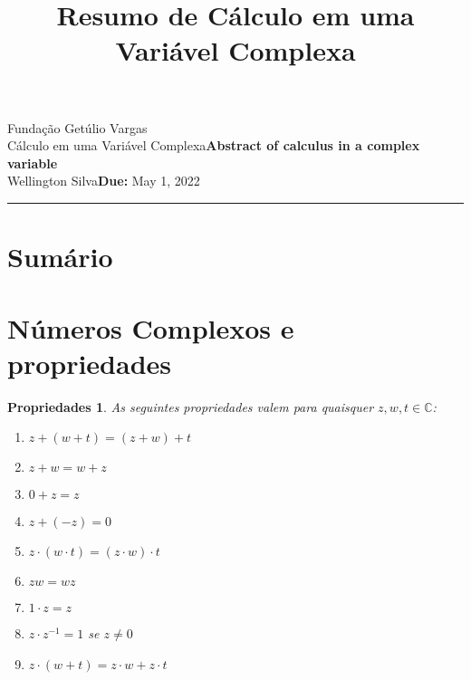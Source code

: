\documentclass{article}
\title{Resumo de Cálculo em uma Variável Complexa}
\author{}
\date{}
\newtheorem{prop}{Propriedades}
\newcommand{\assignment}{Abstract of calculus in a complex variable}
\newcommand{\duedate}{May 1, 2022}
\begin{document}
Fundação Getúlio Vargas\hfill\\
Cálculo em uma Variável Complexa\hfill\textbf{\assignment}\\
Wellington Silva\hfill\textbf{Due:} \duedate\\
\smallskip\hrule\bigskip

{\let\newpage\relax\maketitle}
\maketitle

\section*{Sumário}

\textbf{}
\vspace{4.0mm}

\textbf{}
\vspace{4.0mm}

\textbf{}
\vspace{4.0mm}

\textbf{}
\vspace{4.0mm}

\textbf{}
\vspace{4.0mm}

\textbf{}
\vspace{4.0mm}

\textbf{}
\vspace{4.0mm}

\newpage

\section*{Números Complexos e propriedades}
\label{s1}

\begin{prop} As seguintes propriedades valem para quaisquer $z, w, t \in \mathbb{C}$:

\begin{enumerate}[label=(\alph*)]
    \item $z + (w + t) = (z + w) + t$
    \item $z + w = w + z$
    \item $0 + z = z$
    \item $z + (-z) = 0$
    \item $z \cdot (w \cdot t) = (z \cdot w) \cdot t$
    \item $zw = wz$
    \item $1 \cdot z = z$
    \item $z \cdot z^{-1} = 1$ se $z \neq 0$
    \item $z \cdot (w + t) = z \cdot w + z \cdot t$
\end{enumerate}
\end{prop}
\end{document}
